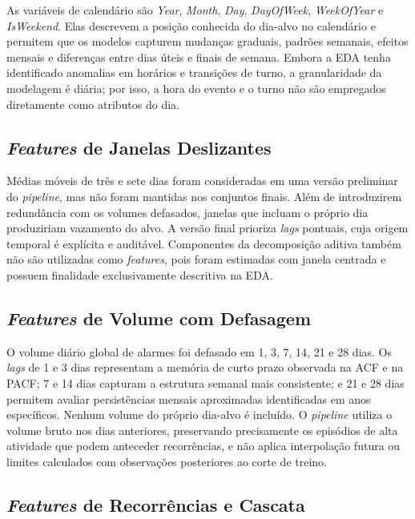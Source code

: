 As variáveis de calendário são \textit{Year}, \textit{Month}, \textit{Day}, \textit{DayOfWeek}, \textit{WeekOfYear} e \textit{IsWeekend}. Elas descrevem a posição conhecida do dia-alvo no calendário e permitem que os modelos capturem mudanças graduais, padrões semanais, efeitos mensais e diferenças entre dias úteis e finais de semana. Embora a EDA tenha identificado anomalias em horários e transições de turno, a granularidade da modelagem é diária; por isso, a hora do evento e o turno não são empregados diretamente como atributos do dia.

\subsection{\textit{Features} de Janelas Deslizantes}

Médias móveis de três e sete dias foram consideradas em uma versão preliminar do \textit{pipeline}, mas não foram mantidas nos conjuntos finais. Além de introduzirem redundância com os volumes defasados, janelas que incluam o próprio dia produziriam vazamento do alvo. A versão final prioriza \textit{lags} pontuais, cuja origem temporal é explícita e auditável. Componentes da decomposição aditiva também não são utilizadas como \textit{features}, pois foram estimadas com janela centrada e possuem finalidade exclusivamente descritiva na EDA.

\subsection{\textit{Features} de Volume com Defasagem}

O volume diário global de alarmes foi defasado em 1, 3, 7, 14, 21 e 28 dias. Os \textit{lags} de 1 e 3 dias representam a memória de curto prazo observada na ACF e na PACF; 7 e 14 dias capturam a estrutura semanal mais consistente; e 21 e 28 dias permitem avaliar persistências mensais aproximadas identificadas em anos específicos. Nenhum volume do próprio dia-alvo é incluído. O \textit{pipeline} utiliza o volume bruto nos dias anteriores, preservando precisamente os episódios de alta atividade que podem anteceder recorrências, e não aplica interpolação futura ou limites calculados com observações posteriores ao corte de treino.

\subsection{\textit{Features} de Recorrências e Cascata}


